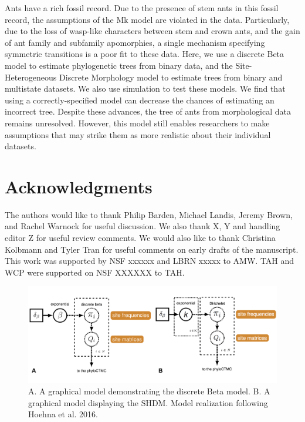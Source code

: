 \documentclass[]{article}
\begin{document}
Ants have a rich fossil record.
Due to the presence of stem ants in this fossil record, the assumptions of the Mk model are violated in the data.
Particularly, due to the loss of wasp-like characters between stem and crown ants, and the gain of ant family and subfamily apomorphies, a single mechanism specifying symmetric transitions is a poor fit to these data. 
Here, we use a discrete Beta model to estimate phylogenetic trees from binary data, and the Site-Heterogeneous Discrete Morphology model to estimate trees from binary and multistate datasets.
We also use simulation to test these models. 
We find that using a correctly-specified model can decrease the chances of estimating an incorrect tree.
Despite these advances, the tree of ants from morphological data remains unresolved.
However, this model still enables researchers to make assumptions that may strike them as more realistic about their individual datasets.
\par

\section{Acknowledgments}

The authors would like to thank Philip Barden, Michael Landis, Jeremy Brown, and Rachel Warnock	 for useful discussion.
We also thank X, Y and handling editor Z for useful review comments.
We would also like to thank Christina Kolbmann and Tyler Tran for useful comments on early drafts of the manuscript.
This work was supported by NSF xxxxxx and LBRN xxxxx to AMW.
TAH and WCP were supported on NSF XXXXXX to TAH.





\begin{figure}
  \caption{A. A graphical model demonstrating the discrete Beta model. B. A graphical model displaying the SHDM. Model realization following Hoehna et al. 2016.}
    \includegraphics[scale=0.35]{fig/1AB}
\end{figure} 
\end{document}
